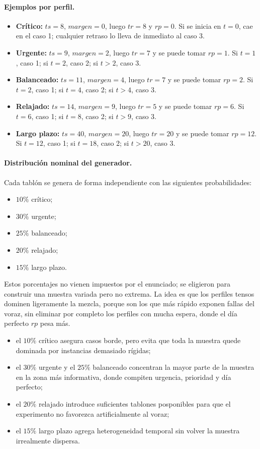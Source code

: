 \documentclass[12pt,a4paper]{article}
\begin{document}
\paragraph{Ejemplos por perfil.}
\begin{itemize}
  \item \textbf{Cr\'itico:} \(ts=8\), \(margen=0\), luego \(tr=8\) y \(rp=0\). Si se inicia en \(t=0\), cae en el caso 1; cualquier retraso lo lleva de inmediato al caso 3.
  \item \textbf{Urgente:} \(ts=9\), \(margen=2\), luego \(tr=7\) y se puede tomar \(rp=1\). Si \(t=1\), caso 1; si \(t=2\), caso 2; si \(t>2\), caso 3.
  \item \textbf{Balanceado:} \(ts=11\), \(margen=4\), luego \(tr=7\) y se puede tomar \(rp=2\). Si \(t=2\), caso 1; si \(t=4\), caso 2; si \(t>4\), caso 3.
  \item \textbf{Relajado:} \(ts=14\), \(margen=9\), luego \(tr=5\) y se puede tomar \(rp=6\). Si \(t=6\), caso 1; si \(t=8\), caso 2; si \(t>9\), caso 3.
  \item \textbf{Largo plazo:} \(ts=40\), \(margen=20\), luego \(tr=20\) y se puede tomar \(rp=12\). Si \(t=12\), caso 1; si \(t=18\), caso 2; si \(t>20\), caso 3.
\end{itemize}

\paragraph{Distribuci\'on nominal del generador.}
Cada tabl\'on se genera de forma independiente con las siguientes probabilidades:
\begin{itemize}
  \item \(10\%\) cr\'itico;
  \item \(30\%\) urgente;
  \item \(25\%\) balanceado;
  \item \(20\%\) relajado;
  \item \(15\%\) largo plazo.
\end{itemize}
Estos porcentajes no vienen impuestos por el enunciado; se eligieron para construir una muestra variada pero no extrema. La idea es que los perfiles tensos dominen ligeramente la mezcla, porque son los que m\'as r\'apido exponen fallas del voraz, sin eliminar por completo los perfiles con mucha espera, donde el d\'ia perfecto \(rp\) pesa m\'as.
\begin{itemize}
  \item el \(10\%\) cr\'itico asegura casos borde, pero evita que toda la muestra quede dominada por instancias demasiado r\'igidas;
  \item el \(30\%\) urgente y el \(25\%\) balanceado concentran la mayor parte de la muestra en la zona m\'as informativa, donde compiten urgencia, prioridad y d\'ia perfecto;
  \item el \(20\%\) relajado introduce suficientes tablones posponibles para que el experimento no favorezca artificialmente al voraz;
  \item el \(15\%\) largo plazo agrega heterogeneidad temporal sin volver la muestra irrealmente dispersa.
\end{itemize}
\end{document}
